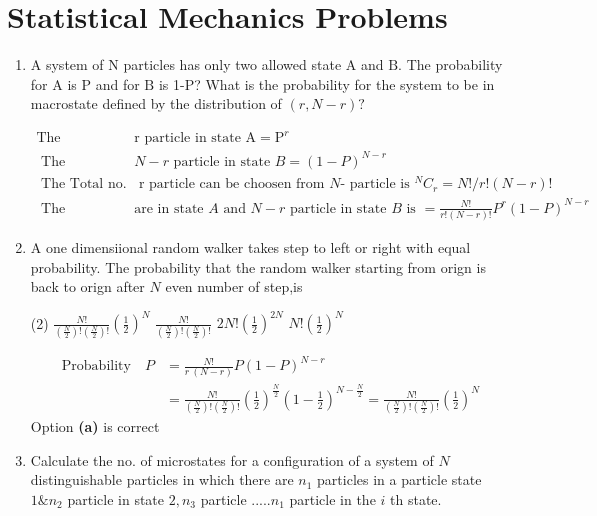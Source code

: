 \chapter{Statistical Mechanics Problems}
\begin{enumerate}
	\item A system of $\mathrm{N}$ particles has only two allowed state $\mathrm{A}$ and $\mathrm{B}$. The probability for $\mathrm{A}$ is $\mathrm{P}$ and for $\mathrm{B}$ is 1-P? What is the probability for the system to be in macrostate defined by the distribution of $(r, N-r) ?$
	\begin{answer}
		 \begin{align*}
		 	\text{The probability of finding }&\mathrm{r}\text{ particle in state } \mathrm{A}=\mathrm{P}^{r}\\
		 	\text{ The probability of finding }&N-r\text{ particle in state } B=(1-P)^{N-r}\\
		 \text{	The Total no. of-ways in which}&\text{ r particle can be choosen from }N \text{- particle is }{ }^{N} C_{r}=N ! / r !(N-r) !\\
		 \text{ The probability in which r particle }&\text{are in state $A$ and $N-r$ particle in state $B$ is }=\frac{N !}{r !(N-r) !} P^{r}(1-P)^{N-r}
		 \end{align*}
	\end{answer}
	\item A one dimensiional random walker takes step to left or right with equal probability. The probability that the random walker starting from orign is back to orign after $N$ even number of step,is 
	 \begin{tasks}(2)
		\task[\textbf{a.}]$\frac{N !}{\left(\frac{N}{2}\right) !\left(\frac{N}{2}\right) !}\left(\frac{1}{2}\right)^{N}$
		\task[\textbf{b.}]$\frac{N!}{(\frac{N}{2})!(\frac{N}{2})!}$
		\task[\textbf{c.}]$2N!(\frac{1}{2})^{2N}$
		\task[\textbf{d.}] $N!(\frac{1}{2})^{N}$
	\end{tasks}
	\begin{answer}
		\begin{align*}
		\text{Probability} \quad P&=\frac{N!}{r~(N-r)}P(1-P)^{N-r}\\
		&=\frac{N !}{\left(\frac{N}{2}\right) !\left(\frac{N}{2}\right) !}\left(\frac{1}{2}\right)^{\frac{N}{2}}\left(1-\frac{1}{2}\right)^{N-\frac{N}{2}}=\frac{N!}{(\frac{N}{2})!(\frac{N}{2})!}\left( \frac{1}{2}\right) ^N
		\end{align*}
		Option \textbf{(a)} is correct
	\end{answer}
	\item Calculate the no. of microstates for a configuration of a system of $N$ distinguishable particles in which there are $n_1$ particles in a particle state $1 \& n_2$ particle in state $2,n_3$ particle .....$n_1$ particle in the $i$ th state.

\end{enumerate}
